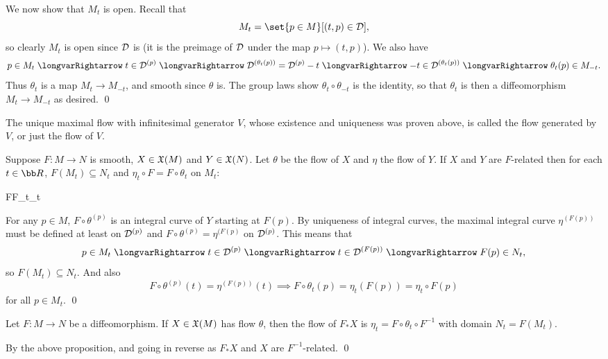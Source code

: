     We now show that $M_t$ is open.
    Recall that
    $$ M_t = \set{p\in M}[(t,p)\in\D] , $$
    so clearly $M_t$ is open since ${{\cal D}}$ is (it is the preimage of ${{\cal D}}$ under the map $p\mapsto(t,p)$).
    We also have
    $$ p\in M_t \implies t\in\D^{(p)} \implies \D^{(\theta_t(p))} = \D^{(p)} - t \implies -t \in \D^{(\theta_t(p))} \implies \theta_t(p) \in M_{-t} . $$
    Thus $\theta_t$ is a map $M_t\to M_{-t}$, and smooth since $\theta$ is.
    The group laws show $\theta_t\circ\theta_{-t}$ is the identity, so that $\theta_t$ is then a diffeomorphism $M_t\to M_{-t}$ as desired.
    \qed

\eproof

\bdefn

    The unique maximal flow with infinitesimal generator $V$, whose existence and uniqueness was proven above, is called the {\emphcolor flow generated by $V$},
    or just the {\emphcolor flow of $V$}.

\edefn

\bprop

    Suppose $F\colon M\to N$ is smooth, $X\in{\frak X}(M)$ and $Y\in{\frak X}(N)$.
    Let $\theta$ be the flow of $X$ and $\eta$ the flow of $Y$.
    If $X$ and $Y$ are $F$-related then for each $t\in\bR$, $F(M_t)\subseteq N_t$ and $\eta_t\circ F=F\circ\theta_t$ on $M_t$:

        {F}{F}{\theta_t}{\eta_t}

\eprop

\bproof

    For any $p\in M$, $F\circ\theta^{(p)}$ is an integral curve of $Y$ starting at $F(p)$.
    By uniqueness of integral curves, the maximal integral curve $\eta^{(F(p))}$ must be defined at least on ${{\cal D}}^{(p)}$ and $F\circ\theta^{(p)}=\eta^{(F(p)}$
    on ${{\cal D}}^{(p)}$.
    This means that
    $$ p\in M_t \implies t \in \D^{(p)} \implies t\in\D^{(F(p))} \implies F(p) \in N_t , $$
    so $F(M_t)\subseteq N_t$.
    And also
    $$ F\circ\theta^{(p)}(t) = \eta^{(F(p))}(t) \implies F\circ\theta_t(p) = \eta_t(F(p)) = \eta_t\circ F(p) $$
    for all $p\in M_t$.
    \qed

\eproof

\bcoro

    Let $F\colon M\to N$ be a diffeomorphism.
    If $X\in{\frak X}(M)$ has flow $\theta$, then the flow of $F_*X$ is $\eta_t=F\circ\theta_t\circ F^{-1}$ with domain $N_t=F(M_t)$.

\ecoro

\bproof

    By the above proposition, and going in reverse as $F_*X$ and $X$ are $F^{-1}$-related.
    \qed

